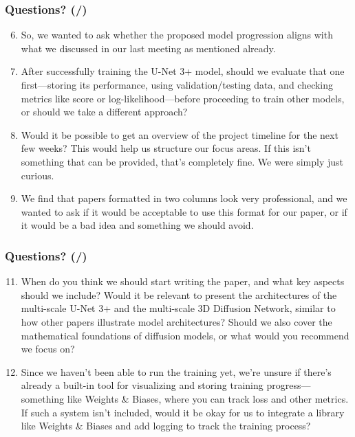 \documentclass[t,24pt]{beamer}
\newcounter{currentQSlide}
\newcounter{totalQSlide}
\newcommand{\incrementQSlideCnt}{%
    \stepcounter{currentQSlide}
}
\begin{document}
\begin{frame}[hoved]
\incrementQSlideCnt
\frametitle{Questions? (\thecurrentQSlide/\thetotalQSlide)}
\begin{enumerate}
\setcounter{enumi}{5}
\item \small So, we wanted to ask whether the proposed model progression aligns with what we discussed in our last meeting as mentioned already.
\item \small After successfully training the U-Net 3+ model, should we evaluate that one first—storing its performance, using validation/testing data, and checking metrics like score or log-likelihood—before proceeding to train other models, or should we take a different approach?
\item \small Would it be possible to get an overview of the project timeline for the next few weeks? This would help us structure our focus areas. If this isn’t something that can be provided, that’s completely fine. We were simply just curious.
\item We find that papers formatted in two columns look very professional, and we wanted to ask if it would be acceptable to use this format for our paper, or if it would be a bad idea and something we should avoid.

\end{enumerate}
\end{frame}

\begin{frame}[hoved]
\incrementQSlideCnt
\frametitle{Questions? (\thecurrentQSlide/\thetotalQSlide)}
\begin{enumerate}
\setcounter{enumi}{10}
\item When do you think we should start writing the paper, and what key aspects should we include? Would it be relevant to present the architectures of the multi-scale U-Net 3+ and the multi-scale 3D Diffusion Network, similar to how other papers illustrate model architectures? Should we also cover the mathematical foundations of diffusion models, or what would you recommend we focus on?
\item Since we haven't been able to run the training yet, we're unsure if there’s already a built-in tool for visualizing and storing training progress—something like Weights \& Biases, where you can track loss and other metrics. If such a system isn't included, would it be okay for us to integrate a library like Weights \& Biases and add logging to track the training process?
\end{enumerate}
\end{frame}
\end{document}
